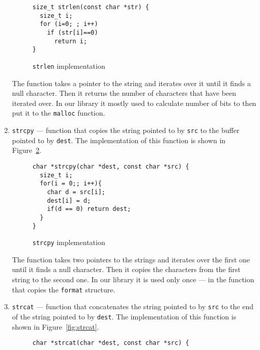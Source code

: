 \documentclass[14pt]{constructor-diploma}
\begin{document}
\begin{enumerate}
\begin{figure}[H]
      \begin{mdframed}[backgroundcolor=bg]
      \begin{verbatim}
size_t strlen(const char *str) {
  size_t i;
  for (i=0; ; i++)
    if (str[i]==0) 
      return i;
}
      \end{verbatim}
      \end{mdframed}
      \caption{\texttt{strlen} implementation}
      \label{fig:strlen}
      \end{figure}
    The function takes a pointer to the string and iterates over it until it finds a null character. 
    Then it returns the number of characters that have been iterated over. In our library it mostly used to
    calculate number of bits to then put it to the \texttt{malloc} function.
  \item \texttt{strcpy} --- function that copies the string pointed to by \texttt{src} to the buffer pointed to by \texttt{dest}. 
    The implementation of this function is shown in Figure~\ref{fig:strcpy}.
      \begin{figure}[H]
      \begin{mdframed}[backgroundcolor=bg]
      \begin{verbatim}
char *strcpy(char *dest, const char *src) {
  size_t i;
  for(i = 0;; i++){
    char d = src[i];
    dest[i] = d;
    if(d == 0) return dest;
  }
}
      \end{verbatim}
      \end{mdframed}
      \caption{\texttt{strcpy} implementation}
      \label{fig:strcpy}
      \end{figure}
    The function takes two pointers to the strings and iterates over the first one until it finds a null character. 
    Then it copies the characters from the first string to the second one. 
    In our library it is used only once --- in the function that copies the \texttt{format} structure.
  \item \texttt{strcat} --- function that concatenates the string pointed to by \texttt{src} to the end of the string pointed to by \texttt{dest}.
    The implementation of this function is shown in Figure~\ref{fig:strcat}.
      \begin{figure}[H]
      \begin{mdframed}[backgroundcolor=bg]
      \begin{verbatim}
char *strcat(char *dest, const char *src) {

\end{verbatim}
\end{mdframed}
\end{figure}
\end{enumerate}
\end{document}

